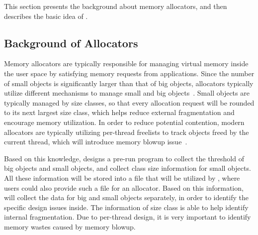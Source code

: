 This section presents the background about memory allocators, and then describes the basic idea of \MP{}. 

\subsection{Background of Allocators}

\label{sec:allocator}
Memory allocators are typically responsible for managing virtual memory inside the user space by satisfying memory requests from applications. Since the number of small objects is significantly larger than that of big objects,  allocators typically utilize different mechanisms to manage small and big objects~\cite{Hoard}. Small objects are typically managed by size classes, so that every allocation request will be rounded to its next largest size class, which helps reduce external fragmentation and encourage memory utilization. In order to reduce potential contention, modern allocators are typically utilizing per-thread freelists to track objects freed by the current thread, which will introduce memory blowup issue~\cite{Hoard}.

Based on this knowledge, \MP{} designs a pre-run program to collect the threshold of big objects and small objects, and collect class size information for small objects. All these information will be stored into a file that will be utilized by \MP{}, where users could also provide such a file for an allocator. Based on this information, \MP{} will collect the data for big and small objects separately, in order to identify the specific design issues inside. The information of size class is able to help identify internal fragmentation. Due to per-thread design, it is very important to identify memory wastes caused by memory blowup. 

 


